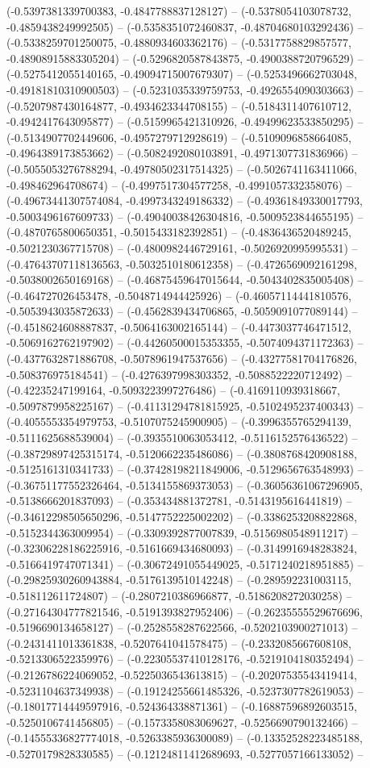(-0.5397381339700383, -0.4847788837128127) -- (-0.5378054103078732, -0.4859438249992505) -- (-0.5358351072460837, -0.48704680103292436) -- (-0.5338259701250075, -0.4880934603362176) -- (-0.5317758829857577, -0.48908915883305204) -- (-0.5296820587843875, -0.4900388720796529) -- (-0.5275412055140165, -0.49094715007679307) -- (-0.5253496662703048, -0.49181810310900503) -- (-0.5231035339759753, -0.4926554090303663) -- (-0.5207987430164877, -0.4934623344708155) -- (-0.5184311407610712, -0.4942417643095877) -- (-0.5159965421310926, -0.49499623533850295) -- (-0.5134907702449606, -0.4957279712928619) -- (-0.5109096858664085, -0.4964389173853662) -- (-0.5082492080103891, -0.4971307731836966) -- (-0.5055053276788294, -0.49780502317514325) -- (-0.5026741163411066, -0.498462964708674) -- (-0.4997517304577258, -0.4991057332358076) -- (-0.49673441307574084, -0.4997343249186332) -- (-0.49361849330017793, -0.5003496167609733) -- (-0.49040038426304816, -0.5009523844655195) -- (-0.4870765800650351, -0.5015433182392851) -- (-0.4836436520489245, -0.5021230367715708) -- (-0.4800982446729161, -0.5026920995995531) -- (-0.47643707118136563, -0.5032510180612358) -- (-0.4726569092161298, -0.5038002650169168) -- (-0.46875459647015644, -0.5043402835005408) -- (-0.464727026453478, -0.5048714944425926) -- (-0.46057114441810576, -0.5053943035872633) -- (-0.4562839434706865, -0.5059091077089144) -- (-0.4518624608887837, -0.5064163002165144) -- (-0.4473037746471512, -0.5069162762197902) -- (-0.44260500015353355, -0.5074094371172363) -- (-0.4377632871886708, -0.5078961947537656) -- (-0.43277581704176826, -0.508376975184541) -- (-0.4276397998303352, -0.5088522220712492) -- (-0.42235247199164, -0.5093223997276486) -- (-0.4169110939318667, -0.5097879958225167) -- (-0.41131294781815925, -0.5102495237400343) -- (-0.4055553354979753, -0.5107075245900905) -- (-0.3996355765294139, -0.5111625688539004) -- (-0.3935510063053412, -0.5116152576436522) -- (-0.38729897425315174, -0.5120662235486086) -- (-0.3808768420908188, -0.5125161310341733) -- (-0.37428198211849006, -0.5129656763548993) -- (-0.36751177552326464, -0.5134155869373053) -- (-0.36056361067296905, -0.5138666201837093) -- (-0.353434881372781, -0.5143195616441819) -- (-0.34612298505650296, -0.5147752225002202) -- (-0.3386253208822868, -0.5152344363009954) -- (-0.3309392877007839, -0.5156980548911217) -- (-0.32306228186225916, -0.5161669434680093) -- (-0.3149916948283824, -0.5166419747071341) -- (-0.30672491055449025, -0.5171240218951885) -- (-0.29825930260943884, -0.5176139510142248) -- (-0.289592231003115, -0.518112611724807) -- (-0.2807210386966877, -0.5186208272030258) -- (-0.27164304777821546, -0.5191393827952406) -- (-0.26235555529676696, -0.5196690134658127) -- (-0.2528558287622566, -0.5202103900271013) -- (-0.2431411013361838, -0.5207641041578475) -- (-0.2332085667608108, -0.5213306522359976) -- (-0.22305537410128176, -0.5219104180352494) -- (-0.2126786224069052, -0.5225036543613815) -- (-0.20207535543419414, -0.5231104637349938) -- (-0.19124255661485326, -0.5237307782619053) -- (-0.18017714449597916, -0.524364338871361) -- (-0.16887596892603515, -0.5250106741456805) -- (-0.1573358083069627, -0.5256690790132466) -- (-0.14555336827774018, -0.5263385936300089) -- (-0.13352528223485188, -0.5270179828330585) -- (-0.12124811412689693, -0.5277057166133052) -- 